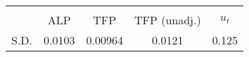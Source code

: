 \begin{tabular}{l*{1}{cccc}}
\toprule
                &\multicolumn{4}{c}{}                   \\
                &ALP&TFP&TFP (unadj.)&$ u_t $\\
\midrule
S.D.              &   0.0103&  0.00964&   0.0121&    0.125\\
\bottomrule
\end{tabular}
